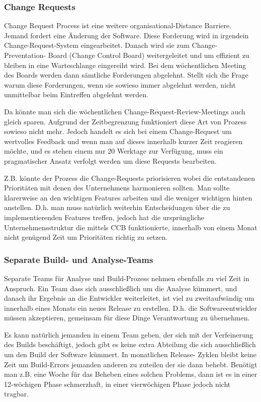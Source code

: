 \subsubsection{Change Requests}
Change Request Process ist eine weitere organisational-Distance Barriere.
Jemand fordert eine Änderung der Software. Diese Forderung wird in irgendein
Change-Request-System eingearbeitet. Danach wird sie zum Change-Preventation-
Board (Change Control Board) weitergeleitet und um effizient zu bleiben in
eine Warteschlange eingereiht wird. Bei dem wöchentlichen Meeting des Boards
werden dann sämtliche Forderungen abgelehnt. Stellt sich die Frage warum diese
Forderungen, wenn sie sowieso immer abgelehnt werden, nicht unmittelbar beim
Eintreffen abgelehnt werden.

Da könnte man sich die wöchentlichen Change-Request-Review-Meetings auch
gleich sparen. Aufgrund der Zeitbegrenzung funktioniert diese Art von Prozess
sowieso nicht mehr. Jedoch handelt es sich bei einem Change-Request um
wertvolles Feedback und wenn man auf dieses innerhalb kurzer Zeit reagieren
möchte, und es stehen einem nur 20 Werktage zur Verfügung, muss ein
pragmatischer Ansatz verfolgt werden um diese Requests bearbeiten.

Z.B. könnte der Prozess die Change-Requests priorisieren wobei die
entstandenen Prioritäten mit denen des Unternehmens harmonieren sollten. Man
sollte klarerweise an den wichtigen Features arbeiten und die weniger
wichtigen hinten anstellen. D.h. man muss natürlich weiterhin Entscheidungen
über die zu implementierenden Features treffen, jedoch hat die ursprüngliche
Unternehmensstruktur die mittels CCB funktionierte, innerhalb von einem Monat
nicht genügend Zeit um Prioritäten richtig zu setzen.

\subsubsection{Separate Build- und Analyse-Teams}
Separate Teams für Analyse und Build-Prozess nehmen ebenfalls zu viel Zeit in
Anspruch. Ein Team dass sich ausschließlich um die Analyse kümmert, und danach
ihr Ergebnis an die Entwickler weiterleitet, ist viel zu zweitaufwändig um
innerhalb eines Monats ein neues Release zu erstellen. D.h. die
Softwareentwickler müssen akzeptieren, gemeinsam für diese Dinge Verantwortung
zu übernehmen.

Es kann natürlich jemanden in einem Team geben, der sich mit der Verfeinerung
des Builds beschäftigt, jedoch gibt es keine extra Abteilung die sich
ausschließlich um den Build der Software kümmert. In monatlichen Release-
Zyklen bleibt keine Zeit um Build-Errors jemanden anderen zu zuteilen der sie
dann behebt. Benötigt man z.B. eine Woche für das Beheben eines solchen
Problems, dann ist es in einer 12-wöchigen Phase schmerzhaft, in einer
vierwöchigen Phase jedoch nicht tragbar.

